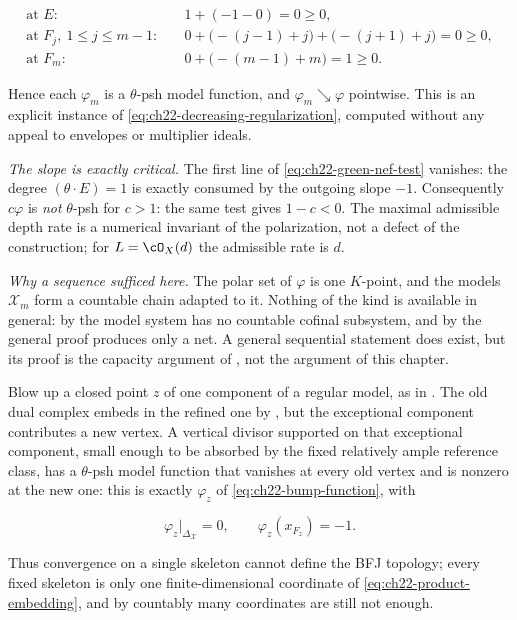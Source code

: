\begin{example}
\[
 \begin{aligned}
 \text{at }E:&\quad 1+(-1-0)=0\geq0,\\
 \text{at }F_j,\ 1\leq j\leq m-1:&\quad
   0+\bigl(-(j-1)+j\bigr)+\bigl(-(j+1)+j\bigr)=0\geq0,\\
 \text{at }F_m:&\quad 0+\bigl(-(m-1)+m\bigr)=1\geq0 .
 \end{aligned}
\tag{22.86}\label{eq:ch22-green-nef-test}
\]

Hence each \(\varphi_m\) is a \(\theta\)-psh model function, and
\(\varphi_m\searrow\varphi\) pointwise.  This is an explicit instance of
\eqref{eq:ch22-decreasing-regularization}, computed without any appeal to
envelopes or multiplier ideals.

\emph{The slope is exactly critical.}  The first line of
\eqref{eq:ch22-green-nef-test} vanishes: the degree \((\theta\cdot E)=1\) is
exactly consumed by the outgoing slope \(-1\).  Consequently
\(c\varphi\) is \emph{not} \(\theta\)-psh for \(c>1\): the same test gives
\(1-c<0\).  The maximal admissible depth rate is a numerical invariant of
the polarization, not a defect of the construction; for
\(L=\cO_X(d)\) the admissible rate is \(d\).

\emph{Why a sequence sufficed here.}  The polar set of \(\varphi\) is one
\(K\)-point, and the models \(\mathcal X_m\) form a countable chain adapted
to it.  Nothing of the kind is available in general: by
 the model system has no countable
cofinal subsystem, and by  the general
proof produces only a net.  A general sequential statement does exist, but
its proof is the capacity argument of
, not the argument of this chapter.
\end{example}

\begin{example}
\label{ex:ch22-one-skeleton-insufficient}
Blow up a closed point \(z\) of one component of a regular model, as in
.  The old dual complex embeds in the refined one by
, but the exceptional component contributes a
new vertex.  A vertical divisor supported on that exceptional component,
small enough to be absorbed by the fixed relatively ample reference class,
has a \(\theta\)-psh model function that vanishes at every old vertex and is
nonzero at the new one: this is exactly
\(\varphi_z\) of \eqref{eq:ch22-bump-function}, with

\[
 \varphi_z|_{\Delta_{\mathcal X}}=0,
 \qquad
 \varphi_z(x_{F_z})=-1 .
\]

Thus convergence on a single skeleton cannot define the BFJ topology; every
fixed skeleton is only one finite-dimensional coordinate of
\eqref{eq:ch22-product-embedding}, and by
 countably many coordinates are still not
enough.
\end{example}

